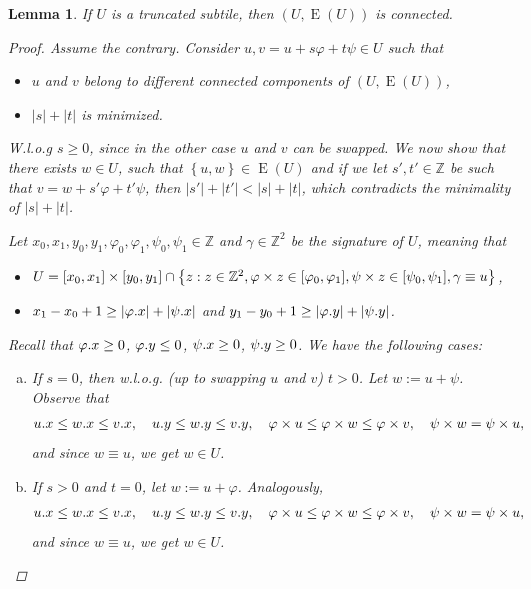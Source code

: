 \documentclass[11pt, letterpaper]{article}
\theoremstyle{plain}
\newtheorem{lemma}{Lemma}
\theoremstyle{definition}
\theoremstyle{remark}
\newcommand{\Z}{\mathbb{Z}}
\renewcommand{\phi}{\varphi}
\newcommand{\set}[1]{\left\lbrace #1 \right\rbrace}
\newcommand{\eq}[1]{\begin{align*} #1 \end{align*}}
\DeclareMathOperator*{\Edges}{E}
\newcommand{\absolute}[1]{\left\lvert#1\right\rvert}
\begin{document}
\begin{lemma}\label{lattice_graph_connectivity}
	If $U$ is a truncated subtile, then $(U, \Edges(U))$ is connected.
	\begin{proof}
		Assume the contrary.
		Consider $u, v = u + s \phi + t \psi \in U$ such that
		\begin{itemize}
			\item $u$ and $v$ belong to different connected components of $(U, \Edges(U))$,
			\item $\absolute{s} + \absolute{t}$ is minimized.
		\end{itemize}
		W.l.o.g $s \ge 0$, since in the other case $u$ and $v$ can be swapped.
		We now show that there exists $w \in U$, such that $\set{u, w} \in \Edges(U)$ and if we let $s', t' \in \Z$ be such that $v = w + s'\phi + t'\psi$, then $\absolute{s'} + \absolute{t'} < \absolute{s} + \absolute{t}$, which contradicts the minimality of $\absolute{s} + \absolute{t}$. 
	
		Let $x_0, x_1, y_0, y_1, \phi_0, \phi_1, \psi_0, \psi_1 \in \Z$ and $\gamma \in \Z^2$ be the signature of $U$, meaning that
		\begin{itemize}
			\item $ U = [x_0, x_1] \times [y_0, y_1] \cap \set{z : z \in \Z^2, \h{z} \in [\phi_0, \phi_1], \s{z} \in [\psi_0, \psi_1], \gamma \equiv u}$,
			\item $x_1 - x_0 + 1 \ge \absolute{\x{\phi}} + \absolute{\x{\psi}}$ and $y_1 - y_0 + 1 \ge \absolute{\y{\phi}} + \absolute{\y{\psi}}$.
		\end{itemize}
		
		Recall that $\x{\phi} \ge 0$, $\y{\phi} \le 0$, $\psi.x \ge 0$, $\psi.y \ge 0$. We have the following cases:
		\begin{enumerate}[(a)]
			\item \label{it:s0_tneg} If $s = 0$, then w.l.o.g. (up to swapping $u$ and $v$) $t > 0$. Let $w := u + \psi$. Observe that
				\eq{
					\x{u} \le \x{w} \le \x{v}, \quad \y{u} \le \y{w} \le \y{v}, \quad \h{u} \le \h{w} \le \h{v}, \quad \s{w} = \s{u},
				}
				and since $w \equiv u$, we get $w \in U$. 
			
			\item If $s > 0$ and $t = 0$, let $w := u + \phi$. Analogously, 
				\eq{
					\x{u} \le \x{w} \le \x{v}, \quad \y{u} \le \y{w} \le \y{v}, \quad \h{u} \le \h{w} \le \h{v}, \quad \s{w} = \s{u},
				}
				and since $w \equiv u$, we get $w \in U$. 
			

\end{enumerate}
\end{proof}
\end{lemma}
\end{document}
